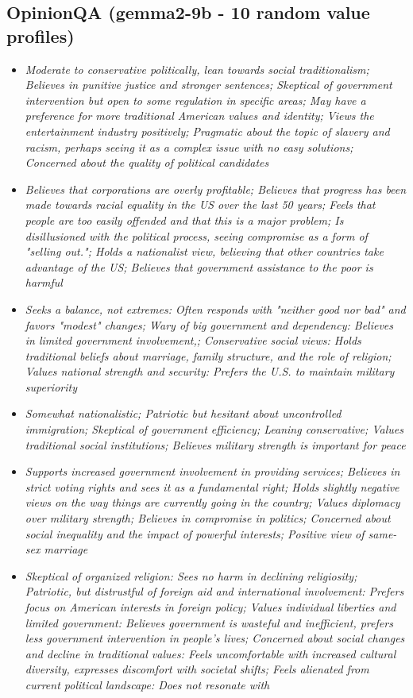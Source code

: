 \documentclass[11pt]{article}
\newcommand{\profiletext}[1]{\textit{#1}}
\begin{document}
\subsection{OpinionQA (gemma2-9b - 10 random value profiles)}
\begin{itemize}
\item \profiletext{Moderate to conservative politically, lean towards social traditionalism; Believes in punitive justice and stronger sentences; Skeptical of government intervention but open to some regulation in specific areas; May have a preference for more traditional American values and identity; Views the entertainment industry positively; Pragmatic about the topic of slavery and racism, perhaps seeing it as a complex issue with no easy solutions; Concerned about the quality of political candidates}
\item \profiletext{Believes that corporations are overly profitable; Believes that progress has been made towards racial equality in the US over the last 50 years; Feels that people are too easily offended and that this is a major problem; Is disillusioned with the political process, seeing compromise as a form of "selling out."; Holds a nationalist view, believing that other countries take advantage of the US; Believes that government assistance to the poor is harmful}
\item \profiletext{Seeks a balance, not extremes: Often responds with "neither good nor bad" and favors "modest" changes; Wary of big government and dependency: Believes in limited government involvement,; Conservative social views: Holds traditional beliefs about marriage, family structure, and the role of religion; Values national strength and security:  Prefers the U.S. to maintain military superiority}
\item \profiletext{Somewhat nationalistic; Patriotic but hesitant about uncontrolled immigration; Skeptical of government efficiency; Leaning conservative; Values traditional social institutions; Believes military strength is important for peace}
\item \profiletext{Supports increased government involvement in providing services; Believes in strict voting rights and sees it as a fundamental right; Holds slightly negative views on the way things are currently going in the country; Values diplomacy over military strength; Believes in compromise in politics; Concerned about social inequality and the impact of powerful interests; Positive view of same-sex marriage}
\item \profiletext{Skeptical of organized religion: Sees no harm in declining religiosity; Patriotic, but distrustful of foreign aid and international involvement: Prefers focus on American interests in foreign policy; Values individual liberties and limited government: Believes government is wasteful and inefficient, prefers less government intervention in people's lives; Concerned about social changes and decline in traditional values: Feels uncomfortable with increased cultural diversity, expresses discomfort with societal shifts; Feels alienated from current political landscape: Does not resonate with}

\end{itemize}
\end{document}
